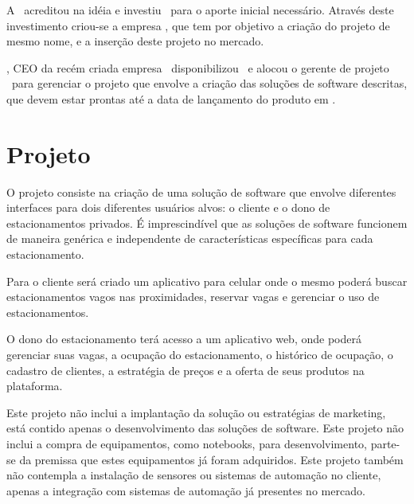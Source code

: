 A \investorCompanyName{}\ acreditou na idéia e investiu \ventureBudget{}\ para o aporte inicial necessário. Através deste investimento criou-se a empresa \startupCompanyName{}, que tem por objetivo a criação do projeto de mesmo nome, e a inserção deste projeto no mercado.

\ceoName{}, CEO da recém criada empresa \startupCompanyName{}\, disponibilizou \maximumBudget{}\ e alocou o gerente de projeto \projectManagerName{}\ para gerenciar o projeto que envolve a criação das soluções de software descritas, que devem estar prontas até a data de lançamento do produto em \maximumDeadline{}.



\section{Projeto}

O projeto consiste na criação de uma solução de software que envolve diferentes interfaces para dois diferentes usuários alvos: o cliente e o dono de estacionamentos privados. É imprescindível que as soluções de software funcionem de maneira genérica e independente de características específicas para cada estacionamento. 

Para o cliente será criado um aplicativo para celular onde o mesmo poderá buscar estacionamentos vagos nas proximidades, reservar vagas e gerenciar o uso de estacionamentos.

O dono do estacionamento terá acesso a um aplicativo web, onde poderá gerenciar suas vagas, a ocupação do estacionamento, o histórico de ocupação, o cadastro de clientes, a estratégia de preços e a oferta de seus produtos na plataforma.

Este projeto não inclui a implantação da solução ou estratégias de marketing, está contido apenas o desenvolvimento das soluções de software. Este projeto não inclui a compra de equipamentos, como notebooks, para desenvolvimento, parte-se da premissa que estes equipamentos já foram adquiridos. Este projeto também não contempla a instalação de sensores ou sistemas de automação no cliente, apenas a integração com sistemas de automação já presentes no mercado.